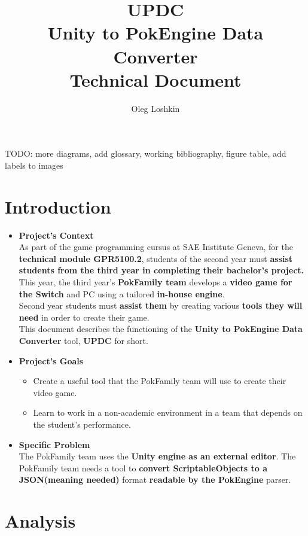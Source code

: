 \documentclass[12pt,a4paper]{article}
\author{Oleg Loshkin}
\title{\textbf{UPDC}\\Unity to PokEngine Data Converter\\\textbf{Technical Document}}
\begin{document}
\maketitle
TODO: more diagrams, add glossary, working bibliography, figure table, add labels to images
\newpage
\tableofcontents
\newpage

\section{Introduction}
	\begin{itemize}
		\item \textbf{Project's Context}
		\\As part of the game programming cursus at SAE Institute Geneva, for the \textbf{technical module GPR5100.2}, students of the second year must \textbf{assist students from the third year in completing their bachelor’s project.}\\ This year, the third year's \textbf{PokFamily team} develops a \textbf{video game for the Switch} and PC using a tailored \textbf{in-house engine}.\\Second year students must \textbf{assist them} by creating various \textbf{tools they will need} in order to create their game.\\This document describes the functioning of the \textbf{Unity to PokEngine Data Converter} tool, \textbf{UPDC} for short.
		
		\item \textbf{Project's Goals}
			\begin{itemize}
				\item Create a useful tool that the PokFamily team will use to create their video game.
				
				\item Learn to work in a non-academic environment in a team that depends on the student’s performance.
				
			\end{itemize}
			
		\item \textbf{Specific Problem}
		\\The PokFamily team uses the \textbf{Unity engine as an external editor}. The PokFamily team needs a tool to \textbf{convert ScriptableObjects to a JSON(meaning needed)} format \textbf{readable by the PokEngine} parser.
	\end{itemize}
\newpage

\section{Analysis}
\end{document}
